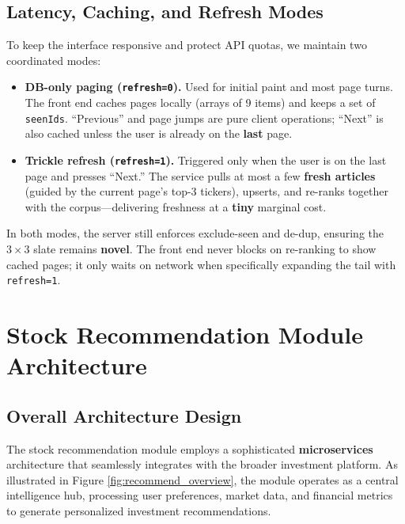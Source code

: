 \subsection{Latency, Caching, and Refresh Modes}

To keep the interface responsive and protect API quotas, we maintain two coordinated modes:

\begin{itemize}
  \item \textbf{DB-only paging (\texttt{refresh=0}).} Used for initial paint and most page turns. The front end caches pages locally (arrays of 9 items) and keeps a set of \texttt{seenIds}. ``Previous'' and page jumps are pure client operations; ``Next'' is also cached unless the user is already on the \textbf{last} page.
  \item \textbf{Trickle refresh (\texttt{refresh=1}).} Triggered only when the user is on the last page and presses ``Next.'' The service pulls at most a few \textbf{fresh articles} (guided by the current page’s top-3 tickers), upserts, and re-ranks together with the corpus---delivering freshness at a \textbf{tiny} marginal cost.
\end{itemize}

In both modes, the server still enforces exclude-seen and de-dup, ensuring the \(3\times 3\) slate remains \textbf{novel}. The front end never blocks on re-ranking to show cached pages; it only waits on network when specifically expanding the tail with \texttt{refresh=1}.

\section{Stock Recommendation Module Architecture}

\subsection{Overall Architecture Design}

The stock recommendation module employs a sophisticated \textbf{microservices} architecture that seamlessly integrates with the broader investment platform. As illustrated in Figure \ref{fig:recommend_overview}, the module operates as a central intelligence hub, processing user preferences, market data, and financial metrics to generate personalized investment recommendations.

